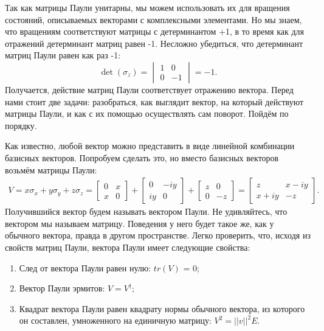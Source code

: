 Так как матрицы Паули унитарны, мы можем использовать их для вращения
состояний, описываемых векторами с комплексными элементами. Но мы знаем, что
вращениям соответствуют матрицы с детерминантом +1, в то время как для
отражений детерминант матриц равен -1. Несложно убедиться, что детерминант
матриц Паули равен как раз -1:
\[
  \det(\sigma_z) = \begin{vmatrix} 1 & 0 \\ 0 & -1 \end{vmatrix} = -1.
\]
Получается, действие матриц Паули соответствует отражению вектора. Перед нами
стоит две задачи: разобраться, как выглядит вектор, на который действуют
матрицы Паули, и как с их помощью осуществлять сам поворот. Пойдём по порядку.

Как известно, любой вектор можно представить в виде линейной комбинации
базисных векторов. Попробуем сделать это, но вместо базисных векторов возьмём
матрицы Паули:
\begin{align*}
  V = x\sigma_x + y\sigma_y + z\sigma_z = \begin{bmatrix} 0 & x \\ x & 0 \end{bmatrix} + \begin{bmatrix} 0 & -iy \\ iy & 0 \end{bmatrix} + \begin{bmatrix} z & 0 \\ 0 & -z \end{bmatrix} = \begin{bmatrix} z & x-iy \\ x+iy & -z \end{bmatrix}.
\end{align*}
Получившийся вектор будем называть вектором Паули. Не удивляйтесь, что вектором
мы называем матрицу. Поведения у него будет такое же, как у обычного вектора,
правда в другом пространстве. Легко проверить, что, исходя из свойств матриц
Паули, вектора Паули имеет следующие свойства:
\begin{enumerate}
  \item След от вектора Паули равен нулю: $tr(V)$ = 0;
  \item Вектор Паули эрмитов: $V = V^{\dagger}$;
  \item Квадрат вектора Паули равен квадрату нормы обычного вектора, из которого он
        составлен, умноженного на единичную матрицу: $V^2 = ||v||^2E$.
\end{enumerate}

